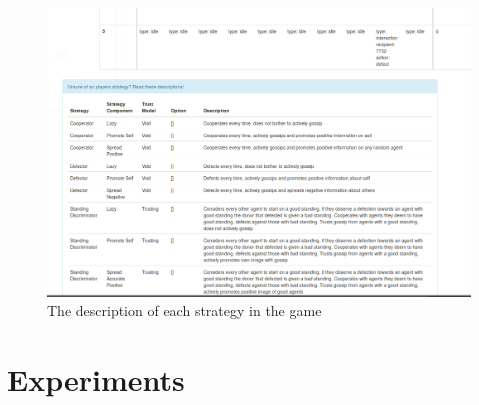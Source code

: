 \documentclass[]{final_report}
\begin{document}
\begin{figure}
	\includegraphics[width=\textwidth]{RepStrats.png}
	\caption{The description of each strategy in the game}
	\label{fig:rep_strats}
\end{figure}

\section{Experiments}
\end{document}
